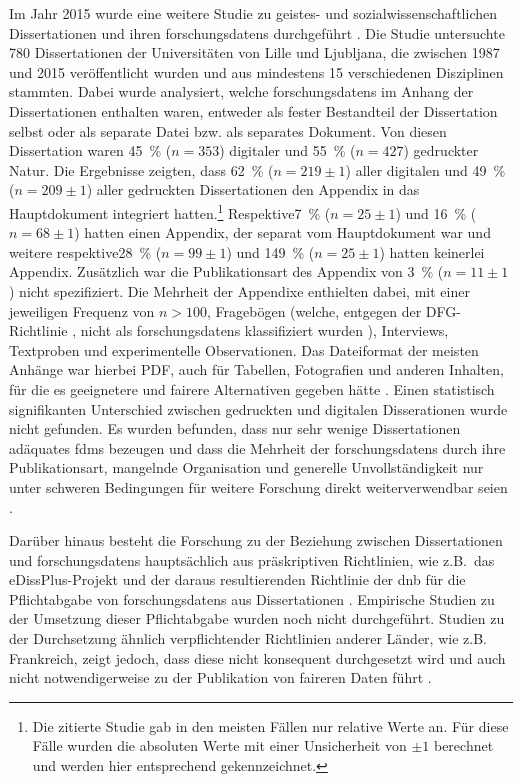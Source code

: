 Im Jahr 2015 wurde eine weitere Studie zu geistes- und sozialwissenschaftlichen Dissertationen und ihren \glspl{forschungsdaten} durchgeführt \autocite{Schöpfel2015}.
Die Studie untersuchte \num{780} Dissertationen der Universitäten von Lille und Ljubljana, die zwischen 1987 und 2015 veröffentlicht wurden und aus mindestens 15 verschiedenen Disziplinen stammten.
Dabei wurde analysiert, welche \glspl{forschungsdaten} im Anhang der Dissertationen enthalten waren, entweder als fester Bestandteil der Dissertation selbst oder als separate Datei bzw. als separates Dokument.
Von diesen Dissertation waren \SI{45}{\percent} ($n=\num{353}$) digitaler und \SI{55}{\percent} ($n=\num{427}$) gedruckter Natur.
Die Ergebnisse zeigten, dass \SI{62}{\percent} ($n=\num{219}\pm 1$) aller digitalen und \SI{49}{\percent} ($n=\num{209}\pm 1$) aller gedruckten Dissertationen den Appendix in das Hauptdokument integriert hatten.\footnote{Die zitierte Studie gab in den meisten Fällen nur relative Werte an. Für diese Fälle wurden die absoluten Werte mit einer Unsicherheit von $\pm 1$ berechnet und werden hier entsprechend gekennzeichnet.}
Respektive\SI{7}{\percent} ($n=\num{25}\pm 1$) und \SI{16}{\percent} ($n=\num{68}\pm 1$) hatten einen Appendix, der separat vom Hauptdokument war und weitere respektive\SI{28}{\percent} ($n=\num{99}\pm 1$) und \SI{149}{\percent} ($n=\num{25}\pm 1$) hatten keinerlei Appendix.
Zusätzlich war die Publikationsart des Appendix von \SI{3}{\percent} ($n=\num{11}\pm 1$) nicht spezifiziert.
Die Mehrheit der Appendixe enthielten dabei, mit einer jeweiligen Frequenz von $n>\num{100}$, Fragebögen (welche, entgegen der DFG-Richtlinie \autocite{dfg-richtlinie}, nicht als \glspl{forschungsdaten} klassifiziert wurden \autocite[14]{Schöpfel2015}), Interviews, Textproben und experimentelle Observationen.
Das Dateiformat der meisten Anhänge war hierbei PDF, auch für Tabellen, Fotografien und anderen Inhalten, für die es geeignetere und \gls{fair}ere Alternativen gegeben hätte \autocite[14]{Schöpfel2015}.
Einen statistisch signifikanten Unterschied zwischen gedruckten und digitalen Disserationen wurde nicht gefunden.
Es wurden befunden, dass nur sehr wenige Dissertationen adäquates \glspl{fdm} bezeugen und dass die Mehrheit der \glspl{forschungsdaten} durch ihre Publikationsart, mangelnde Organisation und generelle Unvollständigkeit nur unter schweren Bedingungen für weitere Forschung direkt weiterverwendbar seien \autocite[S.~20f.]{Schöpfel2015}.

Darüber hinaus besteht die Forschung zu der Beziehung zwischen Dissertationen und \glspl{forschungsdaten} hauptsächlich aus präskriptiven Richtlinien, wie z.B.~das eDissPlus-Projekt \autocite{Weisbrod2017eDissPlus,Weisbrod2018,KleinebergKaden2018} und der daraus resultierenden Richtlinie der \gls{dnb} für die Pflichtabgabe von \glspl{forschungsdaten} aus Dissertationen \autocite{dnb2017}.
Empirische Studien zu der Umsetzung dieser Pflichtabgabe wurden noch nicht durchgeführt.
Studien zu der Durchsetzung ähnlich verpflichtender Richtlinien anderer Länder, wie z.B. Frankreich, zeigt jedoch, dass diese nicht konsequent durchgesetzt wird und auch nicht notwendigerweise zu der Publikation von \gls{fair}eren Daten führt \autocite[vgl.][]{Schöpfel2015}.